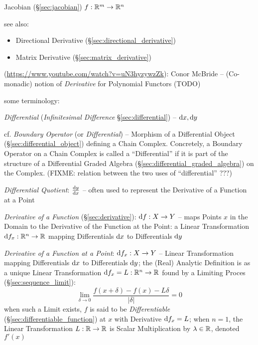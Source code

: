 Jacobian (\S\ref{sec:jacobian}) $f : \mathbb{R}^m \rightarrow \mathbb{R}^n$

see also:

\begin{itemize}
  \item Directional Derivative (\S\ref{sec:directional_derivative})
  \item Matrix Derivative (\S\ref{sec:matrix_derivative})
\end{itemize}

(\url{https://www.youtube.com/watch?v=uN3hyzywzZk}): Conor McBride --
(Co-monadic) notion of \emph{Derivative} for Polynomial Functors (TODO)

some terminology:

\emph{Differential} (\emph{Infinitesimal Difference} \S\ref{sec:differential})
-- $\mathrm{d}x, \mathrm{d}y$

\fist cf. \emph{Boundary Operator} (or \emph{Differential}) -- Morphism of a
Differential Object (\S\ref{sec:differential_object}) defining a Chain Complex.
Concretely, a Boundary Operator on a Chain Complex is called a ``Differential''
if it is part of the structure of a Differential Graded Algebra
(\S\ref{sec:differential_graded_algebra}) on the Complex.
(FIXME: relation between the two uses of ``differential'' ???)

\emph{Differential Quotient}: $\frac{\mathrm{d}y}{\mathrm{d}x}$ -- often used to represent the
Derivative of a Function at a Point

\emph{Derivative of a Function} (\S\ref{sec:derivative}): $\mathrm{d}f : X
\rightarrow Y$ -- maps Points $x$ in the Domain to the Derivative of the
Function at the Point: a Linear Transformation
$\mathrm{d}f_x : \mathbb{R}^n \rightarrow \mathbb{R}$ mapping Differentials $\mathrm{d}x$ to
Differentials $\mathrm{d}y$

\emph{Derivative of a Function at a Point}: $\mathrm{d}f_x : X \rightarrow Y$ --
Linear Transformation mapping Differentials $\mathrm{d}x$ to Differentials
$\mathrm{d}y$; the (Real) Analytic Definition is as a unique Linear Transformation
$\mathrm{d}f_x = L : \mathbb{R}^n \rightarrow \mathbb{R}$ found by a Limiting Proces
(\S\ref{sec:sequence_limit}):
\[
  \lim_{\delta\rightarrow0} \frac{f(x + \delta) - f(x) - L\delta}{|\delta|} = 0
\]
when such a Limit exists, $f$ is said to be \emph{Differentiable}
(\S\ref{sec:differentiable_function}) at $x$ with Derivative $\mathrm{d}f_x = L$;
when $n=1$, the Linear Transformation $L : \mathbb{R} \rightarrow \mathbb{R}$ is Scalar
Multiplication by $\lambda \in \mathbb{R}$, denoted $f'(x)$


